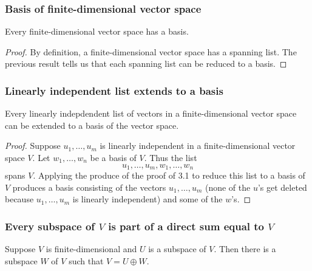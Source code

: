 \documentclass[11pt]{article}
\begin{document}
    \subsubsection{Basis of finite-dimensional vector space}

    Every finite-dimensional vector space has a basis.

    \begin{proof}
        By definition, a finite-dimensional vector space has a spanning list. The previous result tells us that each spanning list can be reduced to a basis.
    \end{proof}

    \subsubsection{Linearly independent list extends to a basis}

    Every linearly indepdendent list of vectors in a finite-dimensional vector space can be extended to a basis of the vector space.

    \begin{proof}
        Suppose \(u_1, \dots, u_m\) is linearly independent in a finite-dimensional vector space $V$. Let \(w_1, \dots, w_n\) be a basis of $V$. Thus the list \[u_1, \dots, u_m, w_1, \dots, w_n\] spans $V$. Applying the produce of the proof of 3.1 to reduce this list to a basis of $V$ produces a basis consisting of the vectors \(u_1, \dots, u_m\) (none of the $u$'s get deleted because \(u_1, \dots, u_m\) is linearly independent) and some of the $w$'s.
    \end{proof}

    \subsubsection{Every subspace of $V$ is part of a direct sum equal to $V$}

    Suppose $V$ is finite-dimensional and $U$ is a subspace of $V$. Then there is a subspace $W$ of $V$ such that \(V = U \oplus W\).
\end{document}

